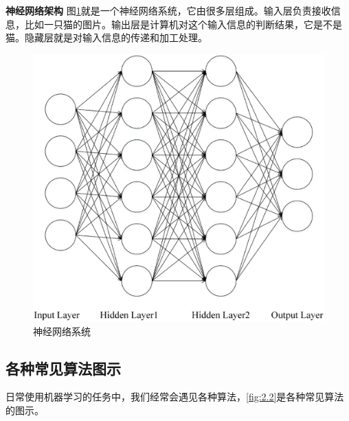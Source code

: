 {\bf 神经网络架构} 图\ref{fig:2.1}就是一个神经网络系统，它由很多层组成。输入层负责接收信息，比如一只猫的图片。输出层是计算机对这个输入信息的判断结果，它是不是猫。隐藏层就是对输入信息的传递和加工处理。

 \begin{figure}[h]
   \centering
   \includegraphics[width=.7\textwidth]{imgs/2.1.eps}
   \caption{神经网络系统}
   \label{fig:2.1}
 \end{figure}

\subsection{各种常见算法图示}

日常使用机器学习的任务中，我们经常会遇见各种算法，\ref{fig:2.2}是各种常见算法的图示。

